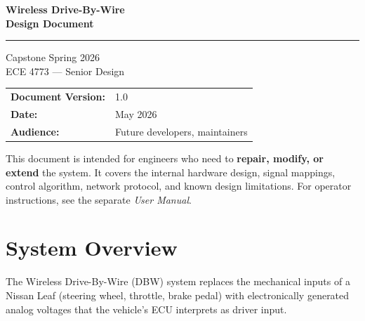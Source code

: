 \documentclass[12pt, letterpaper]{article}
\begin{document}

\begin{titlepage}
  \centering
  \vspace*{2cm}

  {\Huge\bfseries Wireless Drive-By-Wire\\[0.4em]
  \Large Design Document}

  \vspace{0.5cm}\rule{\linewidth}{0.5pt}\vspace{1cm}

  {\large Capstone Spring 2026}\\[0.4cm]
  {\normalsize ECE 4773 --- Senior Design}

  \vspace{2cm}
  \begin{tabular}{ll}
    \textbf{Document Version:} & 1.0 \\
    \textbf{Date:}             & May 2026 \\
    \textbf{Audience:}         & Future developers, maintainers \\
  \end{tabular}

  \vfill

  \begin{notebox}
    This document is intended for engineers who need to \textbf{repair, modify,
    or extend} the system.  It covers the internal hardware design, signal
    mappings, control algorithm, network protocol, and known design limitations.
    For operator instructions, see the separate \textit{User Manual}.
  \end{notebox}

  \vspace{1cm}
\end{titlepage}

\tableofcontents
\newpage

\section{System Overview}

The Wireless Drive-By-Wire (DBW) system replaces the mechanical inputs of a
Nissan Leaf (steering wheel, throttle, brake pedal) with electronically generated
analog voltages that the vehicle's ECU interprets as driver input.
\end{document}
